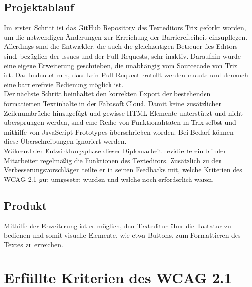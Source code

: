 \subsection{Projektablauf}
Im ersten Schritt ist das GitHub Repository des Texteditors Trix geforkt worden, um die notwendigen Änderungen zur Erreichung der Barrierefreiheit einzupflegen. Allerdings sind die Entwickler, die auch die gleichzeitigen Betreuer des Editors sind, bezüglich der Issues und der Pull Requests, sehr inaktiv. Daraufhin wurde eine eigene Erweiterung geschrieben, die unabhängig vom Sourcecode von Trix ist. Das bedeutet nun, dass kein Pull Request erstellt werden musste und dennoch eine barrierefreie Bedienung möglich ist.\\
Der nächste Schritt beinhaltet den korrekten Export der bestehenden formatierten Textinhalte in der Fabasoft Cloud. Damit keine zusätzlichen Zeilenumbrüche hinzugefügt und gewisse HTML Elemente unterstützt und nicht übersprungen werden, sind eine Reihe von Funktionalitäten in Trix selbst und mithilfe von JavaScript Prototypes überschrieben worden. Bei Bedarf können diese Überschreibungen ignoriert werden.\\
Während der Entwicklungsphase dieser Diplomarbeit revidierte ein blinder Mitarbeiter regelmäßig die Funktionen des Texteditors. Zusätzlich zu den Verbesserungsvorschlägen teilte er in seinen Feedbacks mit, welche Kriterien des WCAG 2.1 gut umgesetzt wurden und welche noch erforderlich waren.

\subsection{Produkt}
Mithilfe der Erweiterung ist es möglich, den Texteditor über die Tastatur zu bedienen und somit visuelle Elemente, wie etwa Buttons, zum Formattieren des Textes zu erreichen. 

\section{Erfüllte Kriterien des WCAG 2.1}